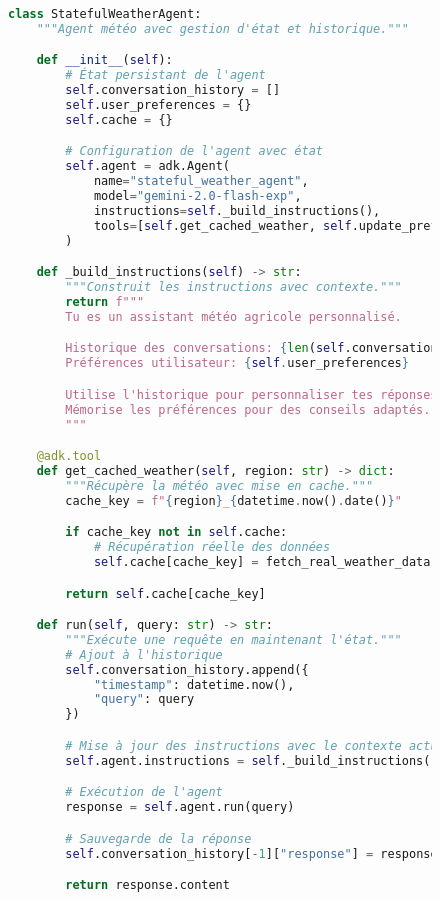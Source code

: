 \begin{figure}[H]
\centering
\begin{lstlisting}[language=Python, caption=Gestion du cycle de vie avec états persistants]
class StatefulWeatherAgent:
    """Agent météo avec gestion d'état et historique."""

    def __init__(self):
        # État persistant de l'agent
        self.conversation_history = []
        self.user_preferences = {}
        self.cache = {}

        # Configuration de l'agent avec état
        self.agent = adk.Agent(
            name="stateful_weather_agent",
            model="gemini-2.0-flash-exp",
            instructions=self._build_instructions(),
            tools=[self.get_cached_weather, self.update_preferences]
        )

    def _build_instructions(self) -> str:
        """Construit les instructions avec contexte."""
        return f"""
        Tu es un assistant météo agricole personnalisé.

        Historique des conversations: {len(self.conversation_history)}
        Préférences utilisateur: {self.user_preferences}

        Utilise l'historique pour personnaliser tes réponses.
        Mémorise les préférences pour des conseils adaptés.
        """

    @adk.tool
    def get_cached_weather(self, region: str) -> dict:
        """Récupère la météo avec mise en cache."""
        cache_key = f"{region}_{datetime.now().date()}"

        if cache_key not in self.cache:
            # Récupération réelle des données
            self.cache[cache_key] = fetch_real_weather_data(region)

        return self.cache[cache_key]

    def run(self, query: str) -> str:
        """Exécute une requête en maintenant l'état."""
        # Ajout à l'historique
        self.conversation_history.append({
            "timestamp": datetime.now(),
            "query": query
        })

        # Mise à jour des instructions avec le contexte actuel
        self.agent.instructions = self._build_instructions()

        # Exécution de l'agent
        response = self.agent.run(query)

        # Sauvegarde de la réponse
        self.conversation_history[-1]["response"] = response.content

        return response.content
\end{lstlisting}
\end{figure}

